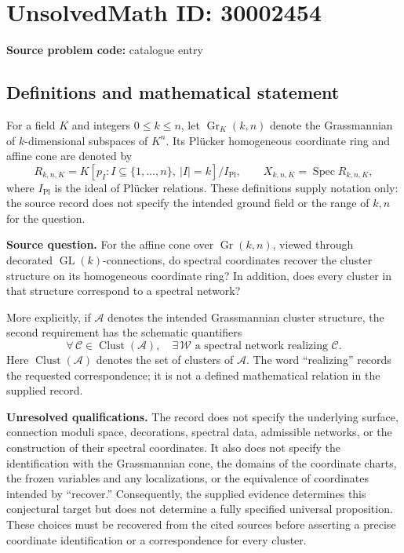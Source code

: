 \documentclass[11pt]{article}
\begin{document}
\section*{UnsolvedMath ID: 30002454}
\textbf{Source problem code:} catalogue entry
\subsection{Definitions and mathematical statement}
For a field \(K\) and integers \(0\leq k\leq n\), let \(\operatorname{Gr}_K(k,n)\) denote the Grassmannian of \(k\)-dimensional subspaces of \(K^n\). Its Pl\"ucker homogeneous coordinate ring and affine cone are denoted by
\[
R_{k,n,K}=K[p_I: I\subseteq\{1,\ldots,n\},\ |I|=k]/I_{\mathrm{Pl}},
\qquad
X_{k,n,K}=\operatorname{Spec}R_{k,n,K},
\]
where \(I_{\mathrm{Pl}}\) is the ideal of Pl\"ucker relations. These definitions supply notation only: the source record does not specify the intended ground field or the range of \(k,n\) for the question.

\textbf{Source question.} For the affine cone over \(\operatorname{Gr}(k,n)\), viewed through decorated \(\operatorname{GL}(k)\)-connections, do spectral coordinates recover the cluster structure on its homogeneous coordinate ring? In addition, does every cluster in that structure correspond to a spectral network?

More explicitly, if \(\mathscr A\) denotes the intended Grassmannian cluster structure, the second requirement has the schematic quantifiers
\[
\forall\,\mathcal C\in\operatorname{Clust}(\mathscr A),
\quad
\exists\,\mathcal W\text{ a spectral network realizing }\mathcal C.
\]
Here \(\operatorname{Clust}(\mathscr A)\) denotes the set of clusters of \(\mathscr A\). The word ``realizing'' records the requested correspondence; it is not a defined mathematical relation in the supplied record.

\textbf{Unresolved qualifications.} The record does not specify the underlying surface, connection moduli space, decorations, spectral data, admissible networks, or the construction of their spectral coordinates. It also does not specify the identification with the Grassmannian cone, the domains of the coordinate charts, the frozen variables and any localizations, or the equivalence of coordinates intended by ``recover.'' Consequently, the supplied evidence determines this conjectural target but does not determine a fully specified universal proposition. These choices must be recovered from the cited sources before asserting a precise coordinate identification or a correspondence for every cluster.
\end{document}
